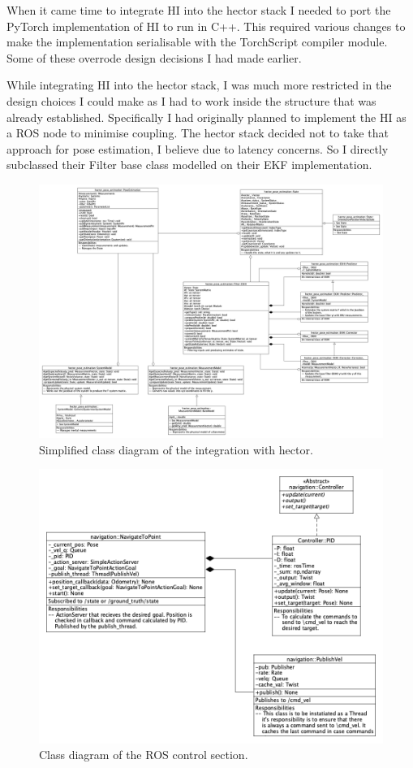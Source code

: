 \documentclass[]{../resources/final_report}
\begin{document}
When it came time to integrate HI into the hector stack I needed to port the PyTorch implementation of HI to run in C++. This required various changes to make the implementation serialisable with the TorchScript compiler module. Some of these overrode design decisions I had made earlier.

While integrating HI into the hector stack, I was much more restricted in the design choices I could make as I had to work inside the structure that was already established. Specifically I had originally planned to implement the HI as a ROS node to minimise coupling. The hector stack decided not to take that approach for pose estimation, I believe due to latency concerns. So I directly subclassed their Filter base class modelled on their EKF implementation.

\begin{figure}[h!]
  \centering
  \includegraphics[width=\textwidth]{ekhi_integrationUML.png}  
  \caption{Simplified class diagram of the integration with hector.}
  \label{}
\end{figure}

\begin{figure}[h!]
  \centering
  \includegraphics[height=0.4\textheight]{NavigationUML.png}  
  \caption{Class diagram of the ROS control section.}
  \label{}
\end{figure}
\end{document}
